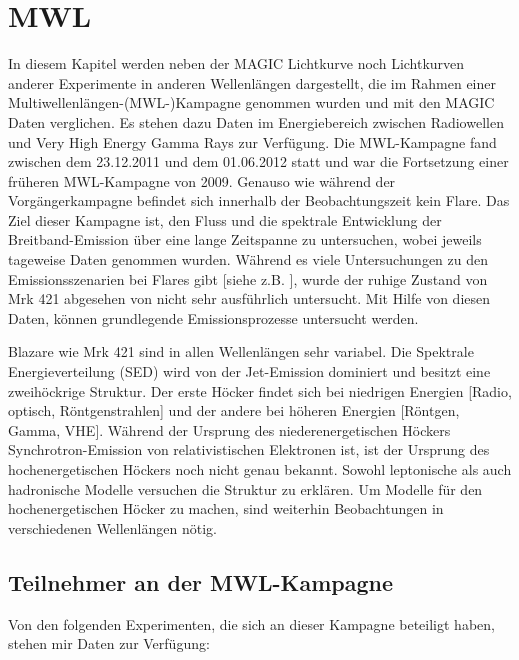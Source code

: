 \chapter{MWL}
\label{chapter:MWL}
In diesem Kapitel werden neben der MAGIC Lichtkurve noch Lichtkurven anderer Experimente in anderen Wellenlängen dargestellt, die im Rahmen einer Multiwellenlängen-(MWL-)Kampagne  genommen wurden und mit den MAGIC Daten verglichen.
Es stehen dazu Daten im Energiebereich zwischen Radiowellen und Very High Energy Gamma Rays zur Verfügung.
Die MWL-Kampagne fand zwischen dem 23.12.2011 und dem 01.06.2012 statt und war die Fortsetzung einer früheren MWL-Kampagne von 2009.
Genauso wie während der Vorgängerkampagne befindet sich innerhalb der Beobachtungszeit kein Flare.
Das Ziel dieser Kampagne ist, den Fluss und die spektrale Entwicklung der Breitband-Emission über eine lange Zeitspanne zu untersuchen, wobei jeweils tageweise Daten genommen wurden.
Während es viele Untersuchungen zu den Emissionsszenarien bei Flares gibt [siehe z.B. \cite{Mrk421Flare}], wurde der ruhige Zustand von Mrk 421 abgesehen von \cite{MWL2009} nicht sehr ausführlich untersucht.
Mit Hilfe von diesen Daten, können grundlegende Emissionsprozesse untersucht werden.

Blazare wie Mrk 421 sind in allen Wellenlängen sehr variabel.
Die Spektrale Energieverteilung (SED) wird von der Jet-Emission dominiert und besitzt eine zweihöckrige Struktur.
Der erste Höcker findet sich bei niedrigen Energien [Radio, optisch, Röntgenstrahlen] und der andere bei höheren Energien [Röntgen, Gamma, VHE].
Während der Ursprung des niederenergetischen Höckers Synchrotron-Emission von relativistischen Elektronen ist, ist der Ursprung des hochenergetischen Höckers noch nicht genau bekannt.
Sowohl leptonische als auch hadronische Modelle versuchen die Struktur zu erklären.
Um Modelle für den hochenergetischen Höcker zu machen, sind weiterhin Beobachtungen in verschiedenen Wellenlängen nötig. 
 

\section{Teilnehmer an der MWL-Kampagne}
Von den folgenden Experimenten, die sich an dieser Kampagne beteiligt haben, stehen mir Daten zur Verfügung:

